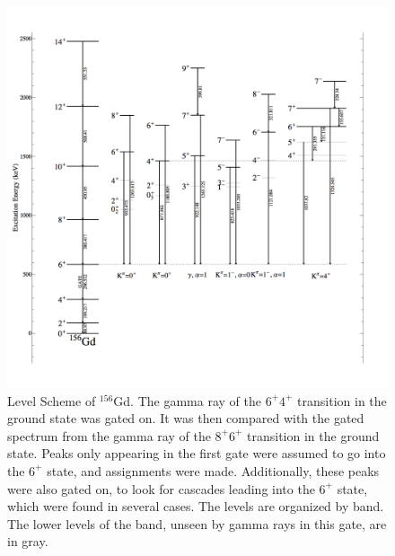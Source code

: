 \begin{figure}
    \centering
    \includegraphics[scale=0.28]{156GdTablesAndFigs/156Gd_6to4.png}
    \caption{Level Scheme of $^{156}$Gd. The gamma ray of the $6^+$\rightarrow$4^+$ transition in the ground state was gated on. It was then compared with the gated spectrum from the gamma ray of the $8^+$\rightarrow$6^+$ transition in the ground state. Peaks only appearing in the first gate were assumed to go into the $6^+$ state, and assignments were made. Additionally, these peaks were also gated on, to look for cascades leading into the $6^+$ state, which were found in several cases. The levels are organized by band. The lower levels of the band, unseen by gamma rays in this gate, are in gray.}
    \label{fig:156_6to4}
\end{figure}

